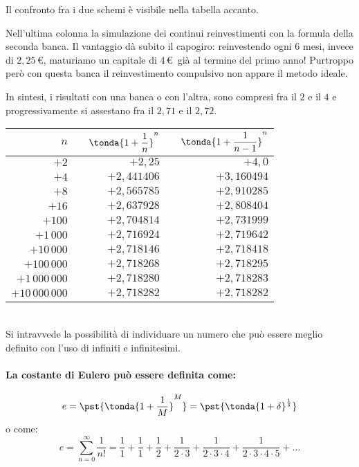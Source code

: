 \noindent \begin{minipage}{.49\textwidth}
Il confronto fra i due schemi è visibile nella tabella accanto.

Nell'ultima colonna la simulazione dei continui reinvestimenti con la formula 
della seconda banca.
Il vantaggio dà subito il capogiro: reinvestendo ogni 6 mesi, 
invece di \(2,25\)\,\euro, maturiamo un capitale di 4\,\euro\ 
già al termine del primo anno! Purtroppo però con questa banca il 
reinvestimento compulsivo non appare il metodo ideale.

In sintesi, i risultati con una banca o con l'altra, sono compresi fra 
il \(2\) e il \(4\) e progressivamente si assestano fra il \(2,71\) e il 
\(2,72\).
\end{minipage}
\hfill
\begin{minipage}{.49\textwidth}
\begin{center}
\begin{tabular}{rrr}
\(\quad n\) &
\(\quad \tonda{1+\dfrac{1}{n}}^n\) &
\(\quad \tonda{1+\dfrac{1}{n-1}}^n\)\\
\hline
\(+2\) & \(+2,25\) & \(+4,0\) \\ 
\(+4\) & \(+2,441406\) & \(+3,160494\) \\ 
\(+8\) & \(+2,565785\) & \(+2,910285\) \\ 
\(+16\) & \(+2,637928\) & \(+2,808404\) \\ 
\(+100\) & \(+2,704814\) & \(+2,731999\) \\ 
\(+1\,000\) & \(+2,716924\) & \(+2,719642\) \\ 
\(+10\,000\) & \(+2,718146\) & \(+2,718418\) \\ 
\(+100\,000\) & \(+2,718268\) & \(+2,718295\) \\ 
\(+1\,000\,000\) & \(+2,718280\) & \(+2,718283\) \\ 
\(+10\,000\,000\) & \(+2,718282\) & \(+2,718282\) \\
\end{tabular}
\label{tab:e}
\end{center}
\end{minipage}\\

Si intravvede la possibilità di individuare un numero che può essere meglio 
definito con l'uso di infiniti e infinitesimi.
\paragraph{La costante di Eulero può essere definita come:}
\[e = \pst{\tonda{1+\frac{1}{M}}^M} = 
\pst{\tonda{1+\delta}^\frac{1}{\delta}} 
\]
o come:
\[e=\sum_{n=0}^{\infty}{\frac{1}{n!}}=
\frac{1}{1}+\frac{1}{1}+\frac{1}{2}+\frac{1}{2\cdot3}+
\frac{1}{2\cdot3\cdot4}+\frac{1}{2\cdot3\cdot4\cdot5}+\dots\]

